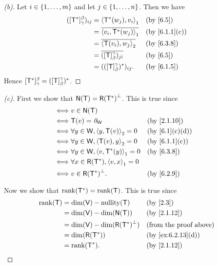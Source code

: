 \begin{proof}[(b)]
  Let \(i \in \left\lbrace1, \dots, m\right\rbrace\) and let \(j \in \left\lbrace1, \dots, n\right\rbrace\).
  Then we have
  \begin{align*}
    ([\T^*]_{\gamma}^{\beta})_{i j} & = \inn{\T^*(w_j), v_i}_1               &  & \text{(by \cref{6.5})}      \\
                                    & = \conj{\inn{v_i, \T^*(w_j)}_1}        &  & \text{(by \cref{6.1.1}(c))} \\
                                    & = \conj{\inn{\T(v_i), w_j}_2}          &  & \text{(by \cref{6.3.8})}    \\
                                    & = \conj{([\T]_{\beta}^{\gamma})_{j i}} &  & \text{(by \cref{6.5})}      \\
                                    & = (([\T]_{\beta}^{\gamma})^*)_{i j}.   &  & \text{(by \cref{6.1.5})}
  \end{align*}
  Hence \([\mathsf{T}^*]_{\gamma}^{\beta} = ([\mathsf{T}]_{\beta}^{\gamma})^*\).
\end{proof}

\begin{proof}[(c)]
  First we show that \(\ns{\T} = \rg{\T^*}^{\perp}\).
  This is true since
  \begin{align*}
    \iff & v \in \ns{\T}                                                               \\
    \iff & \T(v) = \zv_{\W}                          &  & \text{(by \cref{2.1.10})}    \\
    \iff & \forall y \in \W, \inn{y, \T(v)}_2 = 0    &  & \text{(by \cref{6.1}(c)(d))} \\
    \iff & \forall y \in \W, \inn{\T(v), y}_2 = 0    &  & \text{(by \cref{6.1.1}(c))}  \\
    \iff & \forall y \in \W, \inn{v, \T^*(y)}_1 = 0  &  & \text{(by \cref{6.3.8})}     \\
    \iff & \forall x \in \rg{\T^*}, \inn{v, x}_1 = 0                                   \\
    \iff & v \in \rg{\T^*}^{\perp}.                  &  & \text{(by \cref{6.2.9})}
  \end{align*}

  Now we show that \(\rk{\T^*} = \rk{\T}\).
  This is true since
  \begin{align*}
    \rk{\T} & = \dim(\V) - \nt{\T}                 &  & \text{(by \cref{2.3})}          \\
            & = \dim(\V) - \dim(\ns{\T})           &  & \text{(by \cref{2.1.12})}       \\
            & = \dim(\V) - \dim(\rg{\T^*}^{\perp}) &  & \text{(from the proof above)}   \\
            & = \dim(\rg{\T^*})                    &  & \text{(by \cref{ex:6.2.13}(d))} \\
            & = \rk{\T^*}.                         &  & \text{(by \cref{2.1.12})}
  \end{align*}
\end{proof}

